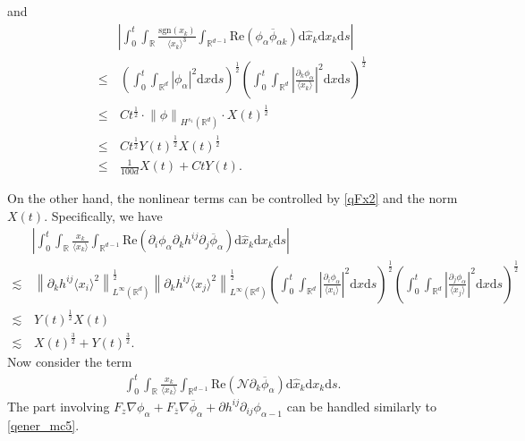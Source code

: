 \documentclass[10pt,twoside,a4paper]{article}
\numberwithin{equation}{section}\allowdisplaybreaks
\def\leq{\leqslant}
\begin{document}
and
\begin{align}
	&\left|\int_0^t \int_{\mathbb{R}}   	\frac{\mathrm{sgn}(x_k)}{\langle x_k\rangle^3}   \int_{\mathbb{R}^{d-1}} \mathrm{Re}\left( \phi_{\alpha }  \overline{\phi}_{\alpha k }\right) \mathrm{d} \hat{x}_k   \mathrm{d} x_k \mathrm{d} s\right|\nonumber\\
	\leq &\,\left(\int_0^t     \int_{\mathbb{R}^{d}} \left|   \phi_{\alpha }   \right|^2  \mathrm{d} x \mathrm{d} s\right)^{\frac 12}   \left(\int_0^t     \int_{\mathbb{R}^{d}} \left|\frac{\partial_k \phi_{\alpha }  } {\langle x_k\rangle}\right|^2  \mathrm{d} x \mathrm{d} s\right)^{\frac 12}\label{X_absorbed}\\
	\leq &\, Ct^{\frac12}\cdot  \left\| \phi     \right\|_{H^{s_1}(\mathbb{R}^d)} \cdot X(t)^{\frac 12}\nonumber\\
	\leq &\, Ct^{\frac12}Y(t)^{\frac 12}  X(t)^{\frac 12} \nonumber\\
	\leq &\, \frac 1{100d} X(t)+ C t  Y(t). \nonumber
\end{align}



On the other hand, the nonlinear terms can be controlled by   \eqref{qFx2} and the norm $ X(t) $. Specifically, we have
\begin{align}  \label{qener_mc5}
	&\left|\int_0^t	\int_{\mathbb{R}}\frac{x_k}{\langle x_k\rangle}   \int_{\mathbb{R}^{d-1}}  \mathrm{Re}\left(\partial_{i} \phi_{\alpha }  \partial_k h^{ij} \partial_j \overline{\phi}_{\alpha }\right) \mathrm{d} \hat{x}_k  \mathrm{d} x_k \mathrm{d} s\right|\\
	\lesssim &\,\left\| \partial_k h^{ij}  \langle x_i\rangle^2 \right\|_{L^\infty(\mathbb{R}^d)}^{\frac{1}{2}}  \left\| \partial_k h^{ij}  \langle x_j\rangle^2 \right\|_{L^\infty(\mathbb{R}^d)}^{\frac{1}{2}} \left(\int_0^t     \int_{\mathbb{R}^{d}} \left|\frac{\partial_i \phi_{\alpha }  } {\langle x_i\rangle}\right|^2  \mathrm{d} x \mathrm{d} s\right)^{\frac 12}   \left(\int_0^t     \int_{\mathbb{R}^{d}} \left|\frac{\partial_j \phi_{\alpha }  } {\langle x_j\rangle}\right|^2  \mathrm{d} x \mathrm{d} s\right)^{\frac 12}\nonumber\\
		\lesssim &\, Y(t)^{\frac 12} X(t) \nonumber\\
	\lesssim &\,  X(t)^{\frac 32}+Y(t)^{\frac 32}.\nonumber
\end{align}
Now consider the term
\begin{align}  \label{qener_mc60}
	\int_0^t	\int_{\mathbb{R}}\frac{x_k}{\langle x_k\rangle}  \int_{\mathbb{R}^{d-1}}  \mathrm{Re} \left(\mathcal{N} \partial_k \overline{\phi}_\alpha\right)   \mathrm{d} \hat{x}_k  \mathrm{d} x_k \mathrm{d} s.
\end{align}
The part involving $ F_z\nabla \phi_\alpha+F_{\overline{z}}\nabla \overline{\phi}_\alpha+\partial h^{ij}\partial_{ij }  \phi_{\alpha -1}$ can be handled similarly to \eqref{qener_mc5}. 
\end{document}

